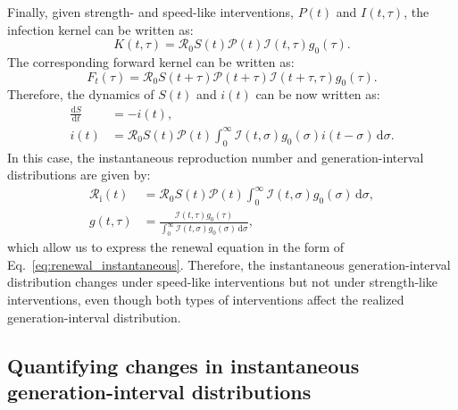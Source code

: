 \documentclass[12pt]{article}
\newcommand{\eref}[1]{Eq.~\ref{eq:#1}}
\newcommand{\Rx}[1]{\ensuremath{{\mathcal R}_{#1}}\xspace}
\newcommand{\Ro}{\Rx{0}}
\newcommand{\Ri}{\Rx{\mathrm{i}}}
\newcommand{\RR}{\ensuremath{{\mathcal R}}\xspace}
\newcommand{\dd}[1]{\ensuremath{\, \mathrm{d}#1}}
\newcommand{\dsigma}{\dd{\sigma}}
\newcommand{\PP}{{\mathcal P}}
\newcommand{\II}{\ensuremath{\mathcal I}}
\begin{document}
Finally, given strength- and speed-like interventions, $P(t)$ and $I(t, \tau)$, the infection kernel can be written as:
\begin{equation}
K(t, \tau) = \Ro S(t) \PP(t) \II(t,\tau) g_0(\tau).
\end{equation}
The corresponding forward kernel can be written as:
\begin{equation}
F_t(\tau) = \Ro S(t+\tau) \PP(t + \tau) \II(t+\tau, \tau) g_0(\tau).
\end{equation}
Therefore, the dynamics of $S(t)$ and $i(t)$ can be now written as:
\begin{align}
\frac{\mathrm{d}S}{\mathrm{d}t} &= - i(t),\\
i(t) &= \Ro S(t) \PP(t) \int_0^\infty \II(t, \sigma) g_0(\sigma) i(t-\sigma)\dsigma.
\end{align}
In this case, the instantaneous reproduction number and generation-interval distributions are given by:
\begin{align}
\Ri(t) &= \RR_0 S(t) \PP(t) \int_0^\infty \II(t,\sigma) g_0(\sigma) \dsigma,\\
g(t, \tau) &= \frac{\II(t,\tau) g_0(\tau)}{\int_0^\infty \II(t,\sigma) g_0(\sigma) \dsigma},
\end{align}
which allow us to express the renewal equation in the form of \eref{renewal_instantaneous}.
Therefore, the instantaneous generation-interval distribution changes under speed-like interventions but not under strength-like interventions, even though both types of interventions affect the realized generation-interval distribution.


\subsection{Quantifying changes in instantaneous generation-interval distributions}
\end{document}
